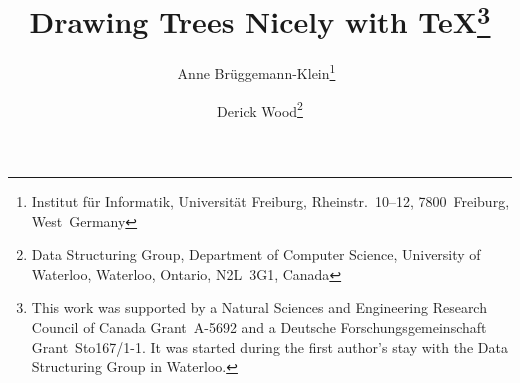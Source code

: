                                                                                 
                                                                
                                                                                
                                                       
                                                                                
\title{Drawing Trees Nicely with \TeX\thanks{This work was supported by         
     a Natural Sciences and Engineering Research Council of Canada              
     Grant~A-5692 and a Deutsche Forschungsgemeinschaft Grant~Sto167/1-1.
     It was started during the first author's stay with              
     the Data Structuring Group in Waterloo.}}                        
\author{Anne Br\"uggemann-Klein\thanks{Institut f\"ur Informatik,     
     Universit\"at Freiburg, Rheinstr.~10--12, 7800~Freiburg,
     West~Germany}\ \and Derick Wood\thanks{Data          
     Structuring Group, Department of Computer Science, University of           
     Waterloo, Waterloo, Ontario, N2L~3G1, Canada}}                             
\maketitle                                                                      
                                                                                
